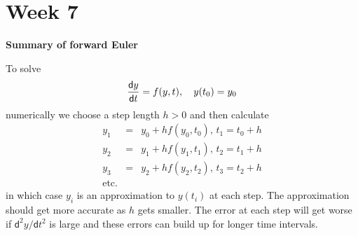 \documentclass[11pt,a4paper]{article}
\newcommand{\dif}{\mathsf{d}}
\begin{document}




\section*{Week 7}



 
{\bf Summary of forward Euler}

To solve $$
{\dif y\over \dif t} = f(y,t),\quad y(t_0)=y_0
$$
numerically we choose a step length $h>0$ and then calculate
\begin{eqnarray*}
y_1 &=& y_0 + h f(y_0,t_0),\, t_1=t_0 +h \\
y_2 &=& y_1 + h f(y_1,t_1),\, t_2=t_1 +h \\
y_3 &=& y_2 + h f(y_2,t_2),\, t_3=t_2 +h \\
\mbox{etc.}
\end{eqnarray*}
in which case $y_i$ is an approximation  to $y(t_i)$ at each step. The approximation should get more accurate as $h$ gets smaller. The error at each step will get worse if $\dif^2 y/ \dif t^2$ is large and these errors can build up for longer time intervals.
 
\end{document}
